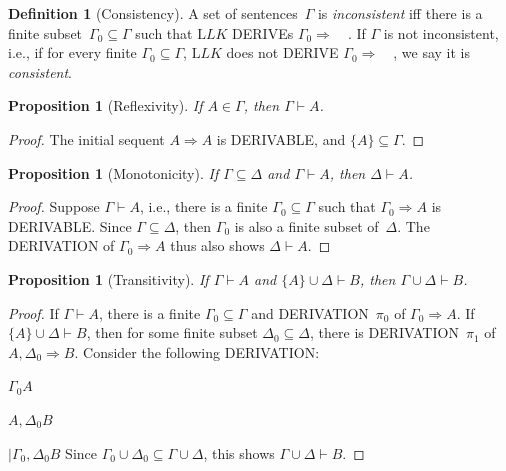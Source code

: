 \documentclass[10pt,a4paper]{article}
\newcommand*{\olup}[1]{\MakeUppercase{#1}}
\theoremstyle{plain}
\newtheorem{prop}[thm]{Proposition}
\theoremstyle{definition}
\newtheorem{defn}[thm]{Definition}
\theoremstyle{remark}
\newcommand*{\ollabel}[1]{\label{#1}}
\providecommand{\AxiomC}[1]{}
\providecommand{\RightLabel}[1]{}
\providecommand{\fCenter}{}
\newenvironment{prooftree}{}{}
\providecommand{\Sequent}{\mathrel{\Rightarrow}}
\providecommand{\Proves}{\mathrel{\vdash}}
\providecommand{\Log}{\ensuremath{\mathrm{L}}}
\providecommand{\Deduce}{\mathrm{D}}
\providecommand{\BinaryInf}{\ensuremath{\mid}}
\providecommand{\Cut}{\mathrm{Cut}}
\begin{document}
\begin{defn}[Consistency]
A set of sentences~$\Gamma$ is \emph{inconsistent} iff there is a
finite subset~$\Gamma_0 \subseteq \Gamma$ such that $\Log{LK}$
\olup{derive}s $\Gamma_0 \Sequent \quad$. If $\Gamma$ is not
inconsistent, i.e., if for every finite $\Gamma_0 \subseteq \Gamma$,
$\Log{LK}$ does not \olup{derive} $\Gamma_0 \Sequent \quad$, we say it is
\emph{consistent}.
\end{defn}

\begin{prop}[Reflexivity]
\ollabel{prop:reflexivity}
If $A \in \Gamma$, then $\Gamma \Proves A$.
\end{prop}

\begin{proof}
The initial sequent $A \Sequent A$ is \olup{derivable}, and $\{A\}
\subseteq \Gamma$.
\end{proof}
  
\begin{prop}[Monotonicity]
\ollabel{prop:monotonicity}
If $\Gamma \subseteq \Delta$ and $\Gamma \Proves A$, then $\Delta
\Proves A$.
\end{prop}

\begin{proof}
Suppose $\Gamma \Proves A$, i.e., there is a finite $\Gamma_0
\subseteq \Gamma$ such that $\Gamma_0 \Sequent A$ is
\olup{derivable}. Since $\Gamma \subseteq \Delta$, then $\Gamma_0$ is
also a finite subset of~$\Delta$. The \olup{derivation} of $\Gamma_0
\Sequent A$ thus also shows $\Delta \Proves A$.
\end{proof}

\begin{prop}[Transitivity]
\ollabel{prop:transitivity}
If $\Gamma \Proves A$ and $\{A\} \cup \Delta \Proves
B$, then $\Gamma \cup \Delta \Proves B$.
\end{prop}

\begin{proof}
If $\Gamma \Proves A$, there is a finite $\Gamma_0 \subseteq \Gamma$
and \olup{derivation}~$\pi_0$ of $\Gamma_0 \Sequent A$.  If $\{A\}
\cup \Delta \Proves B$, then for some finite subset $\Delta_0
\subseteq \Delta$, there is \olup{derivation}~$\pi_1$ of $A, \Delta_0
\Sequent B$. Consider the following \olup{derivation}:
\begin{prooftree}
  \AxiomC{}
  \RightLabel{$\pi_0$}
  \Deduce$\Gamma_0 \fCenter A$
  \AxiomC{}
  \RightLabel{$\pi_1$}
  \Deduce$A, \Delta_0 \fCenter B$
  \RightLabel{\Cut}
  \BinaryInf$\Gamma_0, \Delta_0 \fCenter B$
\end{prooftree}
Since $\Gamma_0 \cup \Delta_0 \subseteq \Gamma \cup \Delta$, this
shows $\Gamma \cup \Delta \Proves B$.
\end{proof}
\end{document}
